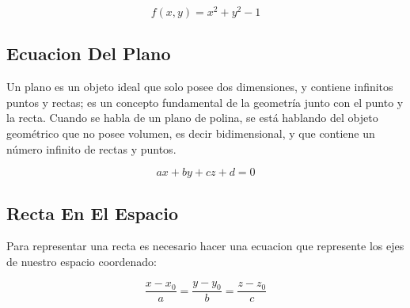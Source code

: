 \documentclass{article}
\begin{document}
\[
f(x,y) = x^2 + y^2 - 1
\]

\subsection{Ecuacion Del Plano}
\label{sec:orgf506b0b}
Un plano es un objeto ideal que solo posee dos dimensiones, y contiene infinitos puntos y rectas; es un concepto fundamental de la geometría junto con el punto y la recta. Cuando se habla de un plano de polina, se está hablando del objeto geométrico que no posee volumen, es decir bidimensional, y que contiene un número infinito de rectas y puntos. 

\[ax+by+cz+d=0\]

\subsection{Recta En El Espacio}
\label{sec:orgf641886}
Para representar una recta es necesario hacer una ecuacion que represente los ejes de nuestro espacio coordenado:

\[
\frac{x-x_0}{a} = \frac{y-y_0}{b} = \frac{z-z_0}{c}
\]
\end{document}
